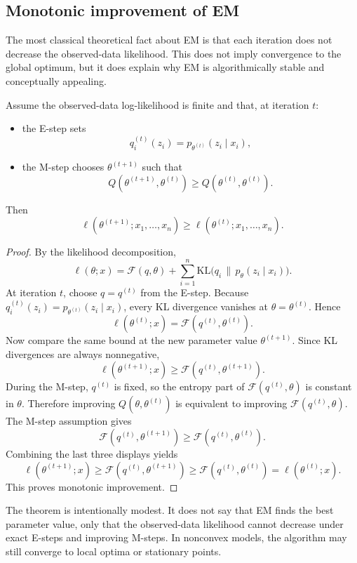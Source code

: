 \subsection*{Monotonic improvement of EM}

The most classical theoretical fact about EM is that each iteration does not decrease the observed-data likelihood.
This does not imply convergence to the global optimum, but it does explain why EM is algorithmically stable and conceptually appealing.

\begin{theorem}
Assume the observed-data log-likelihood is finite and that, at iteration $t$:
\begin{itemize}
    \item the E-step sets
    \[
    q_i^{(t)}(z_i)=p_{\theta^{(t)}}(z_i\mid x_i),
    \]
    \item the M-step chooses $\theta^{(t+1)}$ such that
    \[
    Q(\theta^{(t+1)},\theta^{(t)}) \geq Q(\theta^{(t)},\theta^{(t)}).
    \]
\end{itemize}
Then
\[
\ell(\theta^{(t+1)};x_1,\dots,x_n)
\geq
\ell(\theta^{(t)};x_1,\dots,x_n).
\]
\end{theorem}

\begin{proof}
By the likelihood decomposition,
\[
\ell(\theta;x)=\mathcal{F}(q,\theta)+\sum_{i=1}^n \mathrm{KL}\bigl(q_i\,\|\,p_\theta(z_i\mid x_i)\bigr).
\]
At iteration $t$, choose $q=q^{(t)}$ from the E-step.
Because $q_i^{(t)}(z_i)=p_{\theta^{(t)}}(z_i\mid x_i)$, every KL divergence vanishes at $\theta=\theta^{(t)}$.
Hence
\[
\ell(\theta^{(t)};x)=\mathcal{F}(q^{(t)},\theta^{(t)}).
\]
Now compare the same bound at the new parameter value $\theta^{(t+1)}$.
Since KL divergences are always nonnegative,
\[
\ell(\theta^{(t+1)};x) \geq \mathcal{F}(q^{(t)},\theta^{(t+1)}).
\]
During the M-step, $q^{(t)}$ is fixed, so the entropy part of $\mathcal{F}(q^{(t)},\theta)$ is constant in $\theta$.
Therefore improving $Q(\theta,\theta^{(t)})$ is equivalent to improving $\mathcal{F}(q^{(t)},\theta)$.
The M-step assumption gives
\[
\mathcal{F}(q^{(t)},\theta^{(t+1)})
\geq
\mathcal{F}(q^{(t)},\theta^{(t)}).
\]
Combining the last three displays yields
\[
\ell(\theta^{(t+1)};x)
\geq
\mathcal{F}(q^{(t)},\theta^{(t+1)})
\geq
\mathcal{F}(q^{(t)},\theta^{(t)})
=
\ell(\theta^{(t)};x).
\]
This proves monotonic improvement.
\end{proof}

\noindent
The theorem is intentionally modest.
It does not say that EM finds the best parameter value, only that the observed-data likelihood cannot decrease under exact E-steps and improving M-steps.
In nonconvex models, the algorithm may still converge to local optima or stationary points.


